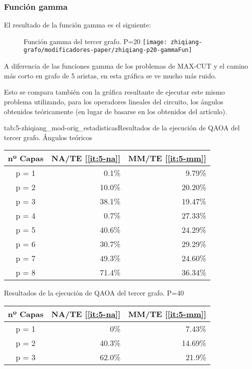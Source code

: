 \subsubsection{Función gamma}

El resultado de la función gamma es el siguiente:

\begin{figure}[htbp]{}{Función gamma del tercer grafo. P=20}
  \centering
  \texttt{[image: zhiqiang-grafo/modificadores-paper/zhiqiang-p20-gammaFun]}
\end{figure}

A diferencia de las funciones gamma de los problemas de MAX-CUT y el camino más corto en grafo de 5 aristas, en esta gráfica se ve mucho más ruido.

Esto se compara también con la gráfica resultante de ejecutar este mismo problema utilizando, para los operadores lineales del circuito, los ángulos obtenidos teóricamente (en lugar de basarse en los obtenidos del artículo).

\begin{table}[htbp]{tab:5-zhiqiang_mod-orig_estadisticas}{Resultados de la ejecución de QAOA del tercer grafo. Ángulos teóricos}
  \centering
  \begin{tabular}{|c|r|r|}
    \hline
    \textbf{nº Capas} & \textbf{NA/TE} [\ref{it:5-na}] & \textbf{MM/TE} [\ref{it:5-mm}] \\ \hline
    p = 1 &  0.1\% &  9.79\% \\ \hline
    p = 2 & 10.0\% & 20.20\% \\ \hline
    p = 3 & 38.1\% & 19.47\% \\ \hline
    p = 4 &  0.7\% & 27.33\% \\ \hline  %
    p = 5 & 40.6\% & 24.29\% \\ \hline
    p = 6 & 30.7\% & 29.29\% \\ \hline
    p = 7 & 49.3\% & 24.60\% \\ \hline
    p = 8 & 71.4\% & 36.34\% \\ \hline
  \end{tabular}
\end{table}

\begin{table}[htbp]{}{Resultados de la ejecución de QAOA del tercer grafo. P=40}
  \centering
  \begin{tabular}{|c|r|r|}
    \hline
    \textbf{nº Capas} & \textbf{NA/TE} [\ref{it:5-na}] & \textbf{MM/TE} [\ref{it:5-mm}] \\ \hline
    p = 1             &    0\%                           &  7.43\%                          \\ \hline
    p = 2             & 40.3\%                           & 14.69\%                          \\ \hline
    p = 3             & 62.0\%                           &  21.9\%                          \\ \hline
  \end{tabular}
\end{table}

